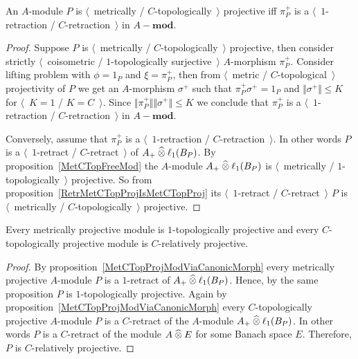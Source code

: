 \begin{proposition}\label{MetCTopProjModViaCanonicMorph} 
An $A$-module $P$ is
$\langle$~metrically / $C$-topologically~$\rangle$ projective iff $\pi_P^+$ is 
a $\langle$~$1$-retraction / $C$-retraction~$\rangle$ in $A-\mathbf{mod}$.
\end{proposition}
\begin{proof}
Suppose $P$ is 
$\langle$~metrically / $C$-topologically~$\rangle$ projective, then consider 
strictly $\langle$~coisometric / $1$-topologically surjective~$\rangle$
$A$-morphism $\pi_P^+$. Consider lifting problem with $\phi=1_P$ 
and $\xi=\pi_P^+$, then from $\langle$~metric / $C$-topological~$\rangle$ 
projectivity of $P$ we get an $A$-morphism $\sigma^+$ such 
that $\pi_P^+\sigma^+=1_P$
and $\Vert\sigma^+\Vert\leq K$ for $\langle$~$K=1$ / $K=C$~$\rangle$.
Since $\Vert\pi_P^+\Vert\Vert \sigma^+\Vert\leq K$ 
we conclude that $\pi_P^+$ is a
$\langle$~$1$-retraction / $C$-retraction~$\rangle$ in $A-\mathbf{mod}$.

Conversely, assume that $\pi_P^+$ is 
a $\langle$~$1$-retraction / $C$-retraction~$\rangle$. In other words $P$ is 
a $\langle$~$1$-retract / $C$-retract~$\rangle$ of $A_+\mathbin{\widehat{\otimes}} \ell_1(B_P)$. 
By proposition~\ref{MetCTopFreeMod} the $A$-module $A_+\mathbin{\widehat{\otimes}} \ell_1(B_P)$ 
is $\langle$~metrically / $1$-topologically~$\rangle$ projective. So from 
proposition~\ref{RetrMetCTopProjIsMetCTopProj} 
its $\langle$~$1$-retract / $C$-retract~$\rangle$ $P$ is 
$\langle$~metrically / $C$-topologically~$\rangle$ projective.
\end{proof}

\begin{proposition}\label{MetProjIsTopProjAndTopProjIsRelProj} Every metrically
projective module is $1$-topologically projective and every $C$-topologically 
projective module is $C$-relatively projective.
\end{proposition}
\begin{proof} By proposition~\ref{MetCTopProjModViaCanonicMorph} every 
metrically projective $A$-module $P$ is a $1$-retract 
of $A_+\mathbin{\widehat{\otimes}} \ell_1(B_P)$. Hence, by the same proposition $P$ 
is $1$-topologically projective. Again by 
proposition~\ref{MetCTopProjModViaCanonicMorph} every $C$-topologically 
projective $A$-module $P$ is a $C$-retract of the $A$-module $A_+\mathbin{\widehat{\otimes}} \ell_1(B_P)$. 
In other words $P$ is a $C$-retract of the module $A\mathbin{\widehat{\otimes}} E$ for some Banach
space $E$. Therefore, $P$ is $C$-relatively projective.
\end{proof}


